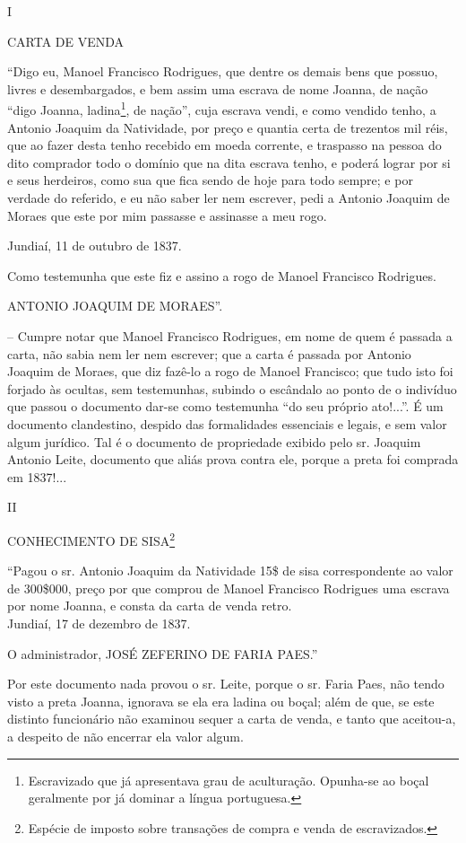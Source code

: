 {I

CARTA DE VENDA

``Digo eu, Manoel Francisco Rodrigues, que dentre os demais bens que
possuo, livres e desembargados, e bem assim uma escrava de nome Joanna,
de nação ``digo Joanna, ladina\footnote{ Escravizado que já apresentava
  grau de aculturação. Opunha-se ao boçal geralmente por já dominar a
  língua portuguesa.}, de nação'', cuja escrava vendi, e como vendido
tenho, a Antonio Joaquim da Natividade, por preço e quantia certa de
trezentos mil réis, que ao fazer desta tenho recebido em moeda corrente,
e traspasso na pessoa do dito comprador todo o domínio que na dita
escrava tenho, e poderá lograr por si e seus herdeiros, como sua que
fica sendo de hoje para todo sempre; e por verdade do referido, e eu não
saber ler nem escrever, pedi a Antonio Joaquim de Moraes que este por
mim passasse e assinasse a meu rogo.

Jundiaí, 11 de outubro de 1837.

Como testemunha que este fiz e assino a rogo de Manoel Francisco
Rodrigues.

ANTONIO JOAQUIM DE MORAES''.

-- Cumpre notar que Manoel Francisco Rodrigues, em nome de quem é
passada a carta, não sabia nem ler nem escrever; que a carta é passada
por Antonio Joaquim de Moraes, que diz fazê-lo a rogo de Manoel
Francisco; que tudo isto foi forjado às ocultas, sem testemunhas,
subindo o escândalo ao ponto de o indivíduo que passou o documento
dar-se como testemunha ``do seu próprio ato!...''. É um documento
clandestino, despido das formalidades essenciais e legais, e sem valor
algum jurídico. Tal é o documento de propriedade exibido pelo sr.
Joaquim Antonio Leite, documento que aliás prova contra ele, porque a
preta foi comprada em 1837!...

II

CONHECIMENTO DE SISA\footnote{ Espécie de imposto sobre transações de
  compra e venda de escravizados.}

``Pagou o sr. Antonio Joaquim da Natividade 15\$ de sisa correspondente
ao valor de 300\$000, preço por que comprou de Manoel Francisco
Rodrigues uma escrava por nome Joanna, e consta da carta de venda
retro.\\
Jundiaí, 17 de dezembro de 1837.

O administrador, JOSÉ ZEFERINO DE FARIA PAES.''

Por este documento nada provou o sr. Leite, porque o sr. Faria Paes, não
tendo visto a preta Joanna, ignorava se ela era ladina ou boçal; além de
que, se este distinto funcionário não examinou sequer a carta de venda,
e tanto que aceitou-a, a despeito de não encerrar ela valor algum.

}
